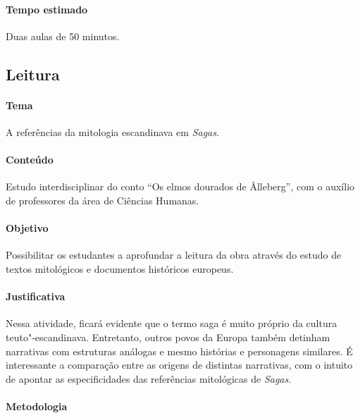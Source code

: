 \documentclass[12pt]{extarticle}
\begin{document}
\paragraph{Tempo estimado} Duas aulas de 50 minutos.




\subsection{Leitura}

\paragraph{Tema} A referências da mitologia escandinava em \emph{Sagas}.

 \paragraph{Conteúdo} Estudo interdisciplinar do conto ``Os elmos dourados de Ålleberg'',
 com o auxílio de professores da área de Ciências Humanas.

\paragraph{Objetivo} Possibilitar os estudantes a aprofundar a leitura da obra através do
estudo de textos mitológicos e documentos históricos europeus.

\paragraph{Justificativa} Nessa atividade, ficará evidente que o termo saga é muito
próprio da cultura teuto"-escandinava. Entretanto, outros povos da Europa
também detinham narrativas com estruturas análogas e mesmo histórias e
personagens similares. É
interessante a comparação entre as origens de distintas narrativas, com 
o intuito de apontar as especificidades das referências mitológicas de \emph{Sagas}.

\paragraph{Metodologia}
\end{document}
